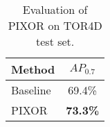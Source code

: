 \begin{table}[t]
\begin{center}
\begin{small}
\begin{tabular}{|l|c|}
\hline
Method & $AP_{0.7}$ \\
\hline
Baseline \cite{yolo} & 69.4\% \\
PIXOR & \textbf{73.3\%} \\
\hline
\end{tabular}
\caption{Evaluation of PIXOR on TOR4D test set.}
\label{tab:our-data}
\end{small}
\end{center}
\vspace{-0.7cm}
\end{table}

